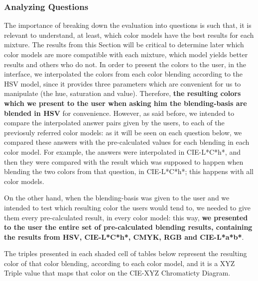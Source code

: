 \subsubsection{Analyzing Questions}
\label{subsubsec:questions_analyzing}
%
The importance of breaking down the evaluation into questions is such that, it is relevant to understand, at least, which color models have the best
results for each mixture. The results from this Section will be critical to determine later which color models are more compatible with each mixture,
which model yields better results and others who do not. In order to present the colors to the user, in the interface, we interpolated the colors from
each color blending according to the HSV model, since it provides three parameters which are convenient for us to manipulate (the hue, saturation and value).
Therefore, \textbf{the resulting colors which we present to the user when asking him the blending-basis are blended in HSV} for convenience. However, as
said before, we intended to compare the interpolated answer pairs given by the users, to each of the previosuly referred color models: as it will be seen
on each question below, we compared these answers with the pre-calculated values for each blending in each color model. For example, the answers were
interpolated in CIE-L*C*h*, and then they were compared with the result which was supposed to happen when blending the two colors from that question, in
CIE-L*C*h*; this happens with all color models. \par
%
On the other hand, when the blending-basis was given to the user and we intended to test which resulting color the users would tend to, we needed to give
them every pre-calculated result, in every color model: this way, \textbf{we presented to the user the entire set of pre-calculated blending results,
containing the results from HSV, CIE-L*C*h*, CMYK, RGB and CIE-L*a*b*}. \par
%
The triples presented in each shaded cell of tables below represent the resulting color of that color blending, according to each color model, and it is
a XYZ Triple value that maps that color on the CIE-XYZ Chromaticty Diagram.
%
